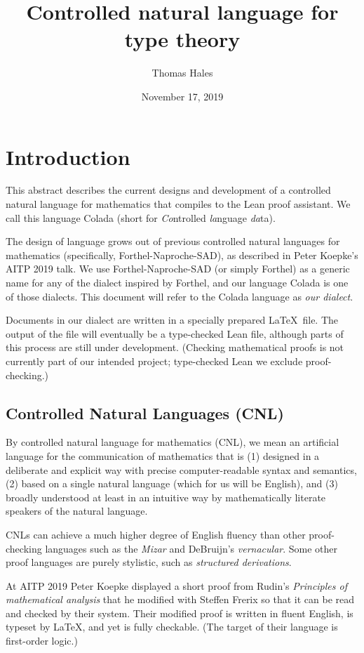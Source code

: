 \documentclass[12pt]{amsart}
\title{Controlled natural language for type theory}
\date{November 17, 2019}
\author{Thomas Hales}
\renewcommand{\~}{\ }
\renewcommand{\_}{\textunderscore}
\begin{document}
\maketitle

\section{Introduction}

This abstract describes the current designs and development of a
controlled natural language for mathematics that compiles to the Lean
proof assistant.  We call this language Colada (short for
\emph{Co}ntrolled \emph{la}nguage \emph{da}ta).

The design of language grows out of previous controlled natural
languages for mathematics (specifically, Forthel-Naproche-SAD), as
described in Peter Koepke's AITP 2019 talk.  We use
Forthel-Naproche-SAD (or simply Forthel) as a generic name for any of
the dialect inspired by Forthel, and our language Colada is one of
those dialects. This document will refer to the Colada language as
\emph{our dialect}.

Documents in our dialect are written in a specially prepared \LaTeX\ file.
The output of the file will eventually be a type-checked Lean file,
although parts of this process are still under development.  (Checking
mathematical proofs is not currently part of our intended project;
type-checked Lean we exclude proof-checking.)

\subsection{Controlled Natural Languages (CNL)}\label{sub:CNL}

By controlled natural language for mathematics (CNL), we mean an
artificial language for the communication of mathematics that is (1)
designed in a deliberate and explicit way with precise
computer-readable syntax and semantics, (2) based on a single natural
language (which for us will be  English), and (3) broadly
understood at least in an intuitive way by mathematically literate
speakers of the natural language.

CNLs can achieve a much higher degree of English fluency than other
proof-checking languages such as the \emph{Mizar} and DeBruijn's
\emph{vernacular}.  Some other proof languages are purely stylistic,
such as \emph{structured derivations}.  

At AITP 2019 Peter Koepke displayed a short proof from Rudin's {\it
  Principles of mathematical analysis} that he modified with Steffen
Frerix so that it can be read and checked by their system. Their
modified proof is written in fluent English, is typeset by \LaTeX, and
yet is fully checkable. (The target of their language is first-order
logic.)
\end{document}
